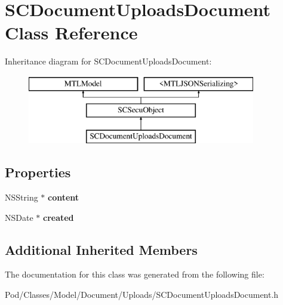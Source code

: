 \hypertarget{interface_s_c_document_uploads_document}{}\section{S\+C\+Document\+Uploads\+Document Class Reference}
\label{interface_s_c_document_uploads_document}
Inheritance diagram for S\+C\+Document\+Uploads\+Document\+:\begin{figure}[H]
\begin{center}
\leavevmode
\includegraphics[height=3.000000cm]{interface_s_c_document_uploads_document}
\end{center}
\end{figure}
\subsection*{Properties}
\begin{DoxyCompactItemize}
\item 
N\+S\+String $\ast$ {\bfseries content}\hypertarget{interface_s_c_document_uploads_document_ada970d6e1531ee6e4e8fae6a156c95f9}{}\label{interface_s_c_document_uploads_document_ada970d6e1531ee6e4e8fae6a156c95f9}

\item 
N\+S\+Date $\ast$ {\bfseries created}\hypertarget{interface_s_c_document_uploads_document_ade2b57ff40b164f0dce16c57b6063505}{}\label{interface_s_c_document_uploads_document_ade2b57ff40b164f0dce16c57b6063505}

\end{DoxyCompactItemize}
\subsection*{Additional Inherited Members}


The documentation for this class was generated from the following file\+:\begin{DoxyCompactItemize}
\item 
Pod/\+Classes/\+Model/\+Document/\+Uploads/S\+C\+Document\+Uploads\+Document.\+h\end{DoxyCompactItemize}
